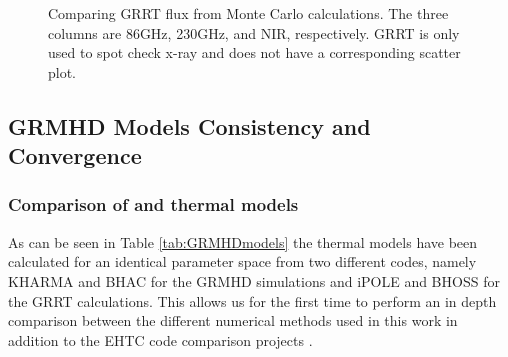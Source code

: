 
\begin{figure}
    \centering
    \caption{Comparing GRRT flux from Monte Carlo calculations.  The three columns are 86GHz, 230GHz, and NIR, respectively.  GRRT is only used to spot check x-ray and does not have a corresponding scatter plot.}
    \label{fig:sed_vv}
\end{figure}

\subsection{GRMHD Models Consistency and Convergence}\label{app:resolution_study}

\subsubsection{Comparison of \kharma and \bhac thermal models}

As can be seen in Table \ref{tab:GRMHDmodels} the thermal models have been calculated for an identical parameter space from two different codes, namely KHARMA and BHAC for the GRMHD simulations and iPOLE and BHOSS for the GRRT calculations. This allows us for the first time to perform an in depth comparison between the different numerical methods used in this work in addition to the EHTC code comparison projects \citep{2019ApJS..243...26P,2020ApJ...897..148G}.

